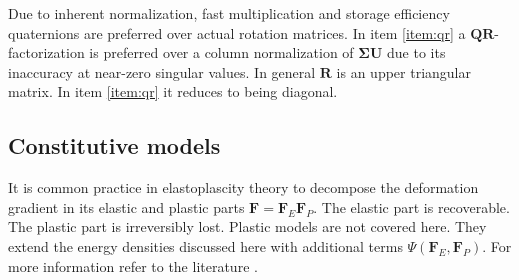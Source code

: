 \documentclass[m,times]{cgMA}
\begin{document}
Due to inherent normalization, fast multiplication and storage efficiency quaternions are preferred over actual rotation matrices. In item \ref{item:qr} a $\boldsymbol{QR}$-factorization is preferred over a column normalization of $\boldsymbol{\Sigma U}$ due to its inaccuracy at near-zero singular values. In general $\boldsymbol{R}$ is an upper triangular matrix. In item \ref{item:qr} it reduces to being diagonal.
\cite{MPM:COURSE}\cite{SVD:3x3}

\subsection{Constitutive models}\label{seq:constitutive_models}
It is common practice in elastoplascity theory to decompose the deformation gradient in its elastic and plastic parts $\boldsymbol{F} = \boldsymbol{F}_E \boldsymbol{F}_P$. The elastic part is recoverable. The plastic part is irreversibly lost. Plastic models are not covered here. They extend the energy densities discussed here with additional terms $\Psi(\boldsymbol{F}_E,\boldsymbol{F}_P)$. For more information refer to the literature \cite{ochsner2014elasto}.
\end{document}
